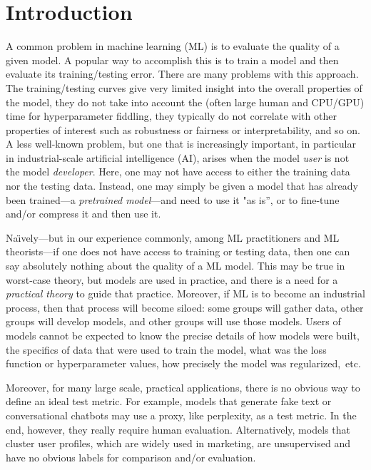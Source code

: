 
\section{Introduction}
\label{sxn:intro}

A common problem in machine learning (ML) 
is to evaluate the quality of a given model.
A popular way to accomplish this
is to train a model and then evaluate its training/testing error.
There are many problems with this approach.
The training/testing curves give very limited insight into the overall properties of the model, 
they do not take into account the (often large human and CPU/GPU) time for hyperparameter fiddling,
they typically do not correlate with other properties of interest such as robustness or fairness or interpretability, 
and so on.
A less well-known problem, but one that is increasingly important, in particular in industrial-scale artificial intelligence (AI), arises when the model \emph{user} is not the model \emph{developer}.
Here, one may not have access to either the training data nor the testing data.
Instead, one may simply be given a model that has already been trained---a \emph{pretrained model}---and need to use it "as is'', or to fine-tune and/or compress it and then use it.

Na\"{\i}vely---but in our experience commonly, among ML practitioners and ML theorists---if one does not have access to training or testing data, then one can say absolutely nothing about the quality of a ML model.
This may be true in worst-case theory, but models are used in practice, and there is a need for a \emph{practical theory} to guide that practice.
Moreover, if ML is to become an industrial process, then that process will become siloed: some groups will gather data, other groups will develop models, and other groups will use those models.
Users of models cannot be expected to know the precise details of how models were built, the specifics of data that were used to train the model, what was the loss function or hyperparameter values, how precisely the model was regularized,~etc.

Moreover, for many large scale, practical applications, there is no obvious way to define an ideal test metric. 
For example, models that generate fake text or conversational chatbots may use a proxy, like perplexity, as a test metric.
In the end, however, they really require human evaluation. 
Alternatively, models that cluster user profiles, which are widely used in marketing, are unsupervised and have no obvious labels for comparison and/or evaluation.

